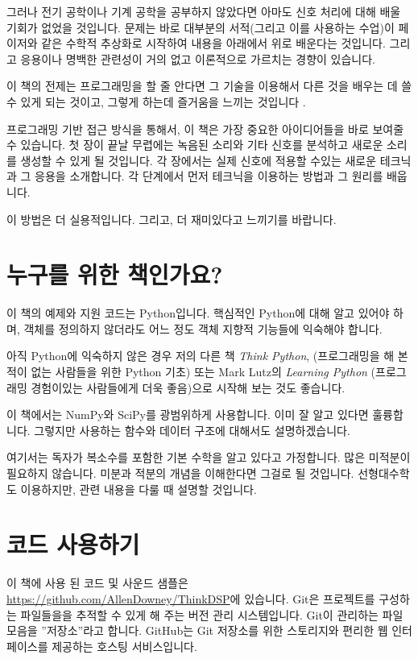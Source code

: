 \documentclass[12pt]{book} \usepackage[width=5.5in,height=8.5in, hmarginratio=3:2,vmarginratio=1:1]{geometry}
\begin{document}
그러나 전기 공학이나 기계 공학을 공부하지 않았다면 아마도 신호 처리에 대해 배울 기회가 없었을 것입니다. 문제는 바로 대부분의 서적(그리고 이를 사용하는 수업)이 페이저와 같은 수학적 추상화로 시작하여 내용을 아래에서 위로 배운다는 것입니다. 그리고 응용이나 명백한 관련성이 거의 없고 이론적으로 가르치는 경향이 있습니다. 

이 책의 전제는 프로그래밍을 할 줄 안다면 그 기술을 이용해서 다른 것을 배우는 데 쓸 수 있게 되는 것이고, 그렇게 하는데 즐거움을 느끼는 것입니다 . 

프로그래밍 기반 접근 방식을 통해서, 이 책은 가장 중요한 아이디어들을 바로 보여줄 수 있습니다. 첫 장이 끝날 무렵에는 녹음된 소리와 기타 신호를 분석하고 새로운 소리를 생성할 수 있게 될 것입니다. 각 장에서는 실제 신호에 적용할 수있는 새로운 테크닉과 그 응용을 소개합니다. 각 단계에서 먼저 테크닉을 이용하는 방법과 그 원리를 배웁니다. 

이 방법은 더 실용적입니다. 그리고, 더 재미있다고 느끼기를 바랍니다. 

\section{누구를 위한 책인가요?} 

이 책의 예제와 지원 코드는 Python입니다. 핵심적인 Python에 대해 알고 있어야 하며, 객체를 정의하지 않더라도 어느 정도 객체 지향적 기능들에 익숙해야 합니다. 

아직 Python에 익숙하지 않은 경우 저의 다른 책 {\it Think Python}, (프로그래밍을 해 본 적이 없는 사람들을 위한 Python 기초)  또는 Mark Lutz의 {\it Learning Python} (프로그래밍 경험이있는 사람들에게 더욱 좋음)으로 시작해 보는 것도 좋습니다. 

이 책에서는 NumPy와 SciPy를 광범위하게 사용합니다. 이미 잘 알고 있다면 훌륭합니다. 그렇지만 사용하는 함수와 데이터 구조에 대해서도 설명하겠습니다. 

여기서는 독자가 복소수를 포함한 기본 수학을 알고 있다고 가정합니다. 많은 미적분이 필요하지 않습니다. 미분과 적분의 개념을 이해한다면 그걸로 될 것입니다. 선형대수학도 이용하지만, 관련 내용을 다룰 때 설명할 것입니다. 

\section{코드 사용하기} \label{code} 

이 책에 사용 된 코드 및 사운드 샘플은 \url{https://github.com/AllenDowney/ThinkDSP}에 있습니다. Git은 프로젝트를 구성하는 파일들을을 추적할 수 있게 해 주는 버전 관리 시스템입니다. Git이 관리하는 파일 모음을 ''저장소''라고 합니다. GitHub는 Git 저장소를 위한 스토리지와 편리한 웹 인터페이스를 제공하는 호스팅 서비스입니다.    
\end{document}
